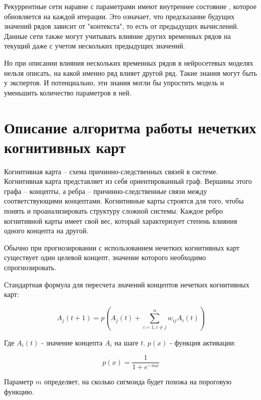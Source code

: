 Рекуррентные сети наравне с параметрами имеют внутреннее состояние , которое обновляется на каждой
итерации. Это означает, что предсказание будущих значений рядов зависит от "контекста",
то есть от предыдущих вычислений. Данные сети также могут учитывать влияние других
временных рядов на текущий даже с учетом нескольких предыдущих значений.

Но при описании влияния нескольких временных рядов в нейросетевых моделях
нельзя описать, на какой именно ряд влияет другой ряд. Такие знания могут быть у
экспертов. И потенциально, эти знания могли бы упростить модель и уменьшить количество
параметров в ней.



\section{Описание алгоритма работы нечетких когнитивных карт}

Когнитивная карта – схема причинно-следственных связей в системе.
Когнитивная карта представляет из себя ориентированный граф.
Вершины этого графа – концепты, а ребра – причинно-следственные связи между соответствующими концептами.
Когнитивные карты строятся для того, чтобы понять и проанализировать структуру сложной системы.
Каждое ребро когнитивной карты имеет свой вес, который характеризует степень влияния одного концепта на другой.

Обычно при прогнозировании с использованием нечетких когнитивных карт существует один целевой концепт,
значение которого необходимо спрогнозировать.


Стандартная формула для пересчета значений концептов нечетких когнитивных карт:

\begin{equation}\label{eq:concepts_recalc}
	A_j(t+1) = p( A_j(t) + \sum_{i = 1, i \neq j}^{n} w_{ij} A_i(t) )
\end{equation}

\noindent Где $ A_i(t) $ - значение концепта $A_i$ на шаге $t$. $ p(x) $ - функция активации:

\begin{equation}\label{eq:sigmiog_actiovation}
	p(x) = \frac {1} {1+ e^{-mx} }
\end{equation}

\noindent Параметр $ m $ определяет, на сколько сигмоида будет похожа на пороговую функцию.

